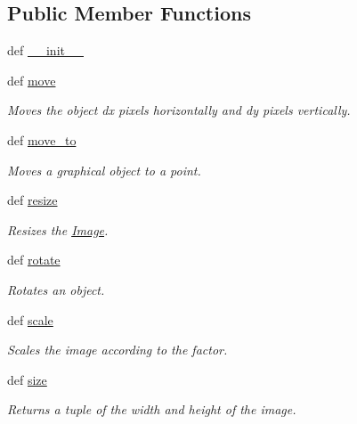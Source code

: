 \subsection*{Public Member Functions}
\begin{DoxyCompactItemize}
\item 
def \hyperlink{classcs110graphics_1_1Image_a3b7c128fa18d85ff4a7586fac04a1bc2}{\_\-\_\-init\_\-\_\-}
\item 
def \hyperlink{classcs110graphics_1_1Image_a540d48247976343a91c610009a9af8cd}{move}
\begin{DoxyCompactList}\small\item\em Moves the object dx pixels horizontally and dy pixels vertically. \item\end{DoxyCompactList}\item 
def \hyperlink{classcs110graphics_1_1Image_a4b2e775fbb0cb523f6bc09028dc05c65}{move\_\-to}
\begin{DoxyCompactList}\small\item\em Moves a graphical object to a point. \item\end{DoxyCompactList}\item 
def \hyperlink{classcs110graphics_1_1Image_a0754151035bb2892f0cd3895b64488fa}{resize}
\begin{DoxyCompactList}\small\item\em Resizes the \hyperlink{classcs110graphics_1_1Image}{Image}. \item\end{DoxyCompactList}\item 
def \hyperlink{classcs110graphics_1_1Image_ac58717d68279e536cee608e2bdfc6aa8}{rotate}
\begin{DoxyCompactList}\small\item\em Rotates an object. \item\end{DoxyCompactList}\item 
def \hyperlink{classcs110graphics_1_1Image_a7a59fde33fe83916a4155fafb5cfb01e}{scale}
\begin{DoxyCompactList}\small\item\em Scales the image according to the factor. \item\end{DoxyCompactList}\item 
def \hyperlink{classcs110graphics_1_1Image_a4ff2da7a167a433f2c38f1e2e2fe7263}{size}
\begin{DoxyCompactList}\small\item\em Returns a tuple of the width and height of the image. \item\end{DoxyCompactList}\item 

\end{DoxyCompactItemize}
